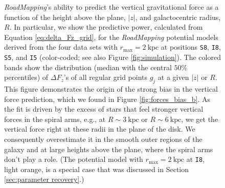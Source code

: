\documentclass[iop,revtex4,numberedappendix,appendixfloats]{emulateapj}
\newcommand{\RM}{{\sl RoadMapping}}
\begin{document}
\begin{figure}[!htbp]
\centering
\caption{\RM{}'s ability to predict the vertical gravitational force as a function of the height above the plane, $|z|$, and galactocentric radius, $R$. In particular, we show the predictive power, calculated from Equation \eqref{eq:delta_Fz_grid}, for the \RM{} potential models derived from the four data sets with $r_\text{max}=2~\text{kpc}$ at positions \texttt{S8}, \texttt{I8}, \texttt{S5}, and \texttt{I5} (color-coded; see also Figure \ref{fig:simulation}). The colored bands show the distribution (median with the central $50\%$ percentiles) of $\Delta F_z$'s of all regular grid points $g_j$ at a given $|z|$ or $R$. This figure demonstrates the origin of the strong bias in the vertical force prediction, which we found in Figure \ref{fig:forces_bias_b}. As the fit is driven by the excess of stars that feel stronger vertical forces in the spiral arms, e.g., at $R\sim3~\text{kpc}$ or $R\sim6~\text{kpc}$, we get the vertical force right at these radii in the plane of the disk. We consequently overestimate it in the smooth outer regions of the galaxy and at large heights above the plane, where the spiral arms don't play a role. (The potential model with $r_\text{max}=2~\text{kpc}$ at \texttt{I8}, light orange, is a special case that was discussed in Section \ref{sec:parameter recovery}.)}
\label{fig:Fg_vs_z_and_R}
\end{figure}
\end{document}
